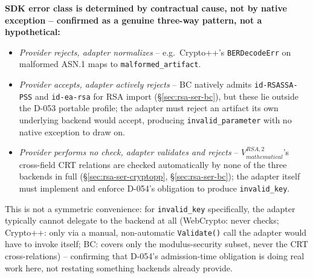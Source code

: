 \documentclass[11pt,a4paper]{article}
\begin{document}
\textbf{SDK error class is determined by contractual cause, not by native exception -- confirmed as a genuine three-way pattern, not a hypothetical:}
\begin{itemize}
\item \emph{Provider rejects, adapter normalizes} -- e.g.\ Crypto++'s \texttt{BERDecodeErr} on malformed ASN.1 maps to \texttt{malformed\_artifact}.
\item \emph{Provider accepts, adapter actively rejects} -- BC natively admits \texttt{id-RSASSA-PSS} and \texttt{id-ea-rsa} for RSA import (\S\ref{sec:rsa-ser-bc}), but these lie outside the D-053 portable profile; the adapter must reject an artifact its own underlying backend would accept, producing \texttt{invalid\_parameter} with no native exception to draw on.
\item \emph{Provider performs no check, adapter validates and rejects} -- $V_{mathematical}^{RSA,2}$'s cross-field CRT relations are checked automatically by none of the three backends in full (\S\ref{sec:rsa-ser-cryptopp}, \S\ref{sec:rsa-ser-bc}); the adapter itself must implement and enforce D-054's obligation to produce \texttt{invalid\_key}.
\end{itemize}
This is not a symmetric convenience: for \texttt{invalid\_key} specifically, the adapter typically cannot delegate to the backend at all (WebCrypto: never checks; Crypto++: only via a manual, non-automatic \texttt{Validate()} call the adapter would have to invoke itself; BC: covers only the modulus-security subset, never the CRT cross-relations) -- confirming that D-054's admission-time obligation is doing real work here, not restating something backends already provide.
\end{document}
